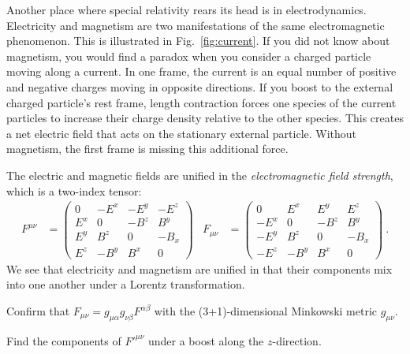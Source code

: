 \documentclass[12pt, oneside]{report}    %
\begin{document}
\begin{subappendices}
Another place where special relativity rears its head is in electrodynamics. Electricity and magnetism are two manifestations of the same electromagnetic phenomenon. This is illustrated in Fig.~\ref{fig:current}. If you did not know about magnetism, you would find a paradox when you consider a charged particle moving along a current. In one frame, the current is an equal number of positive and negative charges moving in opposite directions. If you boost to the external charged particle's rest frame, length contraction forces one species of the current particles to increase their charge density relative to the other species. This creates a net electric field that acts on the stationary external particle. Without magnetism, the first frame is missing this additional force. 

The electric and magnetic fields are unified in the \emph{electromagnetic field strength}, which is a two-index tensor:
\begin{align}
    F^{\mu\nu}
    &=
    \begin{pmatrix}
        0&-E^x&-E^y&-E^z\\
        E^x&0&-B^z&B^y\\
        E^y&B^z&0&-B_x\\
        E^z&-B^y&B^x&0
    \end{pmatrix} %
    &
    F_{\mu\nu}
    &=
    \begin{pmatrix}
        0&E^x&E^y&E^z\\
        -E^x&0&-B^z&B^y\\
        -E^y&B^z&0&-B_x\\
        -E^z&-B^y&B^x&0
    \end{pmatrix} \ .
\end{align}
We see that electricity and magnetism are unified in that their components mix into one another under a Lorentz transformation. 
\begin{exercise}
Confirm that $F_{\mu\nu} =g_{\mu \alpha}g_{\nu\beta} F^{\alpha\beta}$ with the (3+1)-dimensional Minkowski metric $g_{\mu\nu}$. 
\end{exercise}
\begin{exercise}
Find the components of $F'^{\mu\nu}$ under a boost along the $z$-direction. 
\end{exercise}



\end{subappendices}
\end{document}
